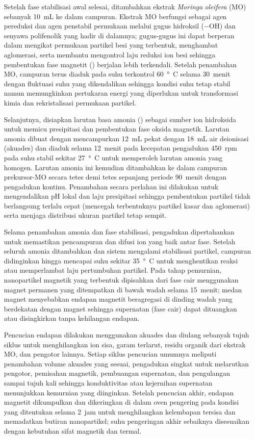 Setelah fase stabilisasi awal selesai, ditambahkan ekstrak \textit{Moringa oleifera} (MO) sebanyak \SI{10}{mL} ke dalam campuran. Ekstrak MO berfungsi sebagai agen pereduksi dan agen penstabil permukaan melalui gugus hidroksil ($-\text{OH}$) dan senyawa polifenolik yang hadir di dalamnya; gugus-gugus ini dapat berperan dalam mengikat permukaan partikel besi yang terbentuk, menghambat aglomerasi, serta membantu mengontrol laju reduksi ion besi sehingga pembentukan fase magnetit () berjalan lebih terkendali. Setelah penambahan MO, campuran terus diaduk pada suhu terkontrol \SI{60}{\degree C} selama \SI{30}{menit} dengan fluktuasi suhu yang dikendalikan sehingga kondisi suhu tetap stabil namun memungkinkan pertukaran energi yang diperlukan untuk transformasi kimia dan rekristalisasi permukaan partikel.

Selanjutnya, disiapkan larutan basa amonia () sebagai sumber ion hidroksida untuk memicu presipitasi dan pembentukan fase oksida magnetik. Larutan amonia dibuat dengan mencampurkan \SI{12}{mL}  pekat dengan \SI{18}{mL} air deionisasi (akuades) dan diaduk selama \SI{12}{menit} pada kecepatan pengadukan \SI{450}{rpm} pada suhu stabil sekitar \SI{27}{\degree C} untuk memperoleh larutan amonia yang homogen. Larutan amonia ini kemudian ditambahkan ke dalam campuran prekursor-MO secara tetes demi tetes sepanjang periode \SI{90}{menit} dengan pengadukan kontinu. Penambahan secara perlahan ini dilakukan untuk mengendalikan pH lokal dan laju presipitasi sehingga pembentukan partikel tidak berlangsung terlalu cepat (mencegah terbentuknya partikel kasar dan aglomerasi) serta menjaga distribusi ukuran partikel tetap sempit.

Selama penambahan amonia dan fase stabilisasi, pengadukan dipertahankan untuk memastikan pencampuran dan difusi ion yang baik antar fase. Setelah seluruh amonia ditambahkan dan sistem mengalami stabilisasi partikel, campuran didinginkan hingga mencapai suhu sekitar \SI{35}{\degree C} untuk menghentikan reaksi atau memperlambat laju pertumbuhan partikel. Pada tahap pemurnian, nanopartikel magnetik yang terbentuk dipisahkan dari fase cair menggunakan magnet permanen yang ditempatkan di bawah wadah selama \SI{15}{menit}; medan magnet menyebabkan endapan magnetit beragregasi di dinding wadah yang berdekatan dengan magnet sehingga supernatan (fase cair) dapat dituangkan atau disingkirkan tanpa kehilangan endapan.

Pencucian endapan dilakukan menggunakan akuades dan diulang sebanyak tujuh siklus untuk menghilangkan ion sisa, garam terlarut, residu organik dari ekstrak MO, dan pengotor lainnya. Setiap siklus pencucian umumnya meliputi penambahan volume akuades yang sesuai, pengadukan singkat untuk melarutkan pengotor, pemisahan magnetik, pembuangan supernatan, dan pengulangan sampai tujuh kali sehingga konduktivitas atau kejernihan supernatan menunjukkan kemurnian yang diinginkan. Setelah pencucian akhir, endapan magnetit dikumpulkan dan dikeringkan di dalam oven pengering pada kondisi yang ditentukan selama \SI{2}{jam} untuk menghilangkan kelembapan tersisa dan memadatkan butiran nanopartikel; suhu pengeringan akhir sebaiknya disesuaikan dengan kebutuhan sifat magnetik dan termal.

